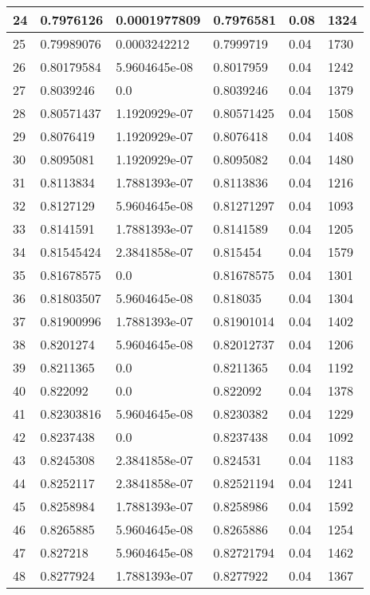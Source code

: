 \begin{longtable}{|l|l|l|l|l|l|}
24 & 0.7976126 & 0.0001977809 & 0.7976581 & 0.08 & 1324 \\ \hline 
25 & 0.79989076 & 0.0003242212 & 0.7999719 & 0.04 & 1730 \\ \hline 
26 & 0.80179584 & 5.9604645e-08 & 0.8017959 & 0.04 & 1242 \\ \hline 
27 & 0.8039246 & 0.0 & 0.8039246 & 0.04 & 1379 \\ \hline 
28 & 0.80571437 & 1.1920929e-07 & 0.80571425 & 0.04 & 1508 \\ \hline 
29 & 0.8076419 & 1.1920929e-07 & 0.8076418 & 0.04 & 1408 \\ \hline 
30 & 0.8095081 & 1.1920929e-07 & 0.8095082 & 0.04 & 1480 \\ \hline 
31 & 0.8113834 & 1.7881393e-07 & 0.8113836 & 0.04 & 1216 \\ \hline 
32 & 0.8127129 & 5.9604645e-08 & 0.81271297 & 0.04 & 1093 \\ \hline 
33 & 0.8141591 & 1.7881393e-07 & 0.8141589 & 0.04 & 1205 \\ \hline 
34 & 0.81545424 & 2.3841858e-07 & 0.815454 & 0.04 & 1579 \\ \hline 
35 & 0.81678575 & 0.0 & 0.81678575 & 0.04 & 1301 \\ \hline 
36 & 0.81803507 & 5.9604645e-08 & 0.818035 & 0.04 & 1304 \\ \hline 
37 & 0.81900996 & 1.7881393e-07 & 0.81901014 & 0.04 & 1402 \\ \hline 
38 & 0.8201274 & 5.9604645e-08 & 0.82012737 & 0.04 & 1206 \\ \hline 
39 & 0.8211365 & 0.0 & 0.8211365 & 0.04 & 1192 \\ \hline 
40 & 0.822092 & 0.0 & 0.822092 & 0.04 & 1378 \\ \hline 
41 & 0.82303816 & 5.9604645e-08 & 0.8230382 & 0.04 & 1229 \\ \hline 
42 & 0.8237438 & 0.0 & 0.8237438 & 0.04 & 1092 \\ \hline 
43 & 0.8245308 & 2.3841858e-07 & 0.824531 & 0.04 & 1183 \\ \hline 
44 & 0.8252117 & 2.3841858e-07 & 0.82521194 & 0.04 & 1241 \\ \hline 
45 & 0.8258984 & 1.7881393e-07 & 0.8258986 & 0.04 & 1592 \\ \hline 
46 & 0.8265885 & 5.9604645e-08 & 0.8265886 & 0.04 & 1254 \\ \hline 
47 & 0.827218 & 5.9604645e-08 & 0.82721794 & 0.04 & 1462 \\ \hline 
48 & 0.8277924 & 1.7881393e-07 & 0.8277922 & 0.04 & 1367 \\ \hline 

\end{longtable}
